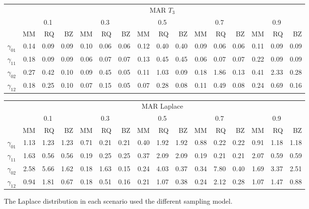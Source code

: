 \documentclass[12pt]{article}
\begin{document}
\begin{table}[ht]
  \begin{tabular}{rrrrrrrrrrrrrrrr}
    \toprule
    & \multicolumn{ 15}{c}{MAR $T_3$} \\
    \cline{2-16}
    &  \multicolumn{3}{c}{0.1} &  \multicolumn{3}{c}{0.3} &  \multicolumn{3}{c}{0.5} &
    \multicolumn{3}{c}{0.7} &  \multicolumn{3}{c}{0.9} \\
    \cline{2-16}
    & MM   & RQ   & BZ   & MM   & RQ   & BZ   & MM   & RQ   & BZ   & MM   & RQ   & BZ   & MM   & RQ   & BZ   \\
    \hline
    $\gamma_{01}$  & 0.14 & 0.09 & 0.09 & 0.10 & 0.06 & 0.06 & 0.12 & 0.40 & 0.40 & 0.09 & 0.06 & 0.06 & 0.11 & 0.09 & 0.09 \\
    $\gamma_{11}$  & 0.18 & 0.09 & 0.09 & 0.06 & 0.07 & 0.07 & 0.13 & 0.45 & 0.45 & 0.06 & 0.07 & 0.07 & 0.22 & 0.09 & 0.09 \\
    $\gamma_{02}$  & 0.27 & 0.42 & 0.10 & 0.09 & 0.45 & 0.05 & 0.11 & 1.03 & 0.09 & 0.18 & 1.86 & 0.13 & 0.41 & 2.33 & 0.28 \\
    $\gamma_{12}$  & 0.18 & 0.25 & 0.10 & 0.07 & 0.15 & 0.05 & 0.07 & 0.28 & 0.08 & 0.11 & 0.49 & 0.08 & 0.24 & 0.69 & 0.16 \\
    \bottomrule
  \end{tabular}

  \begin{tabular}{rrrrrrrrrrrrrrrr}
    \hline
    & \multicolumn{15}{c}{MAR Laplace } \\
    \cline{2-16}
    &  \multicolumn{3}{c}{0.1} &  \multicolumn{3}{c}{0.3} &  \multicolumn{3}{c}{0.5} &
    \multicolumn{3}{c}{0.7} &  \multicolumn{3}{c}{0.9} \\
    \cline{2-16}
    & MM   & RQ   & BZ   & MM   & RQ   & BZ   & MM   & RQ   & BZ   & MM   & RQ   & BZ   & MM   & RQ   & BZ   \\
    \hline
    $\gamma_{01}$ & 1.13 & 1.23 & 1.23 & 0.71 & 0.21 & 0.21 & 0.40 & 1.92 & 1.92 & 0.88 & 0.22 & 0.22 & 0.91 & 1.18 & 1.18 \\
    $\gamma_{11}$ & 1.63 & 0.56 & 0.56 & 0.19 & 0.25 & 0.25 & 0.37 & 2.09 & 2.09 & 0.19 & 0.21 & 0.21 & 2.07 & 0.59 & 0.59 \\
    $\gamma_{02}$ & 2.58 & 5.66 & 1.62 & 0.18 & 1.63 & 0.15 & 0.24 & 4.03 & 0.37 & 0.34 & 7.80 & 0.40 & 1.69 & 3.37 & 2.51 \\
    $\gamma_{12}$ & 0.94 & 1.81 & 0.67 & 0.18 & 0.51 & 0.16 & 0.21 & 1.07 & 0.38 & 0.24 & 2.12 & 0.28 & 1.07 & 1.47 & 0.88 \\
    \hline
  \end{tabular}

  The Laplace distribution in each scenario used the different sampling model.

\end{table}
\end{document}
